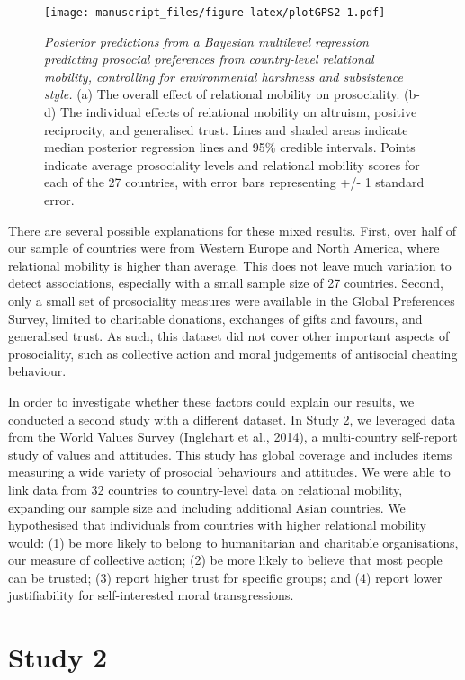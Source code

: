 \documentclass[
  man,floatsintext]{apa6}
\begin{document}
\begin{figure}
\centering
\texttt{[image: manuscript\_files/figure-latex/plotGPS2-1.pdf]}
\caption{\label{fig:plotGPS2}\emph{Posterior predictions from a Bayesian multilevel regression predicting prosocial preferences from country-level relational mobility, controlling for environmental harshness and subsistence style.} (a) The overall effect of relational mobility on prosociality. (b-d) The individual effects of relational mobility on altruism, positive reciprocity, and generalised trust. Lines and shaded areas indicate median posterior regression lines and 95\% credible intervals. Points indicate average prosociality levels and relational mobility scores for each of the 27 countries, with error bars representing +/- 1 standard error.}
\end{figure}

There are several possible explanations for these mixed results. First, over half of our sample of countries were from Western Europe and North America, where relational mobility is higher than average. This does not leave much variation to detect associations, especially with a small sample size of 27 countries. Second, only a small set of prosociality measures were available in the Global Preferences Survey, limited to charitable donations, exchanges of gifts and favours, and generalised trust. As such, this dataset did not cover other important aspects of prosociality, such as collective action and moral judgements of antisocial cheating behaviour.

In order to investigate whether these factors could explain our results, we conducted a second study with a different dataset. In Study 2, we leveraged data from the World Values Survey (Inglehart et al., 2014), a multi-country self-report study of values and attitudes. This study has global coverage and includes items measuring a wide variety of prosocial behaviours and attitudes. We were able to link data from 32 countries to country-level data on relational mobility, expanding our sample size and including additional Asian countries. We hypothesised that individuals from countries with higher relational mobility would: (1) be more likely to belong to humanitarian and charitable organisations, our measure of collective action; (2) be more likely to believe that most people can be trusted; (3) report higher trust for specific groups; and (4) report lower justifiability for self-interested moral transgressions.

\hypertarget{study-2}{%
\section{Study 2}\label{study-2}}
\end{document}
